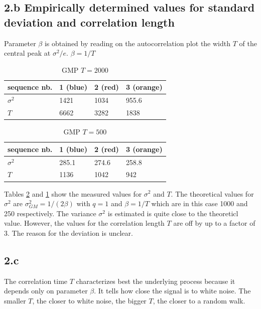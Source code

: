 \documentclass{article}
\begin{document}
\subsection*{2.b Empirically determined values for standard deviation and correlation length}

Parameter $\beta$ is obtained by reading on the autocorrelation plot the width $T$ of the central peak at $\sigma^2/e$. $\beta = 1/T$

\begin{table}[h]
\centering
\begin{tabular}{llll}
sequence nb. & 1 (blue) & 2 (red) & 3 (orange) \\ \hline
$\sigma^2$ &  1421 & 1034 & 955.6  \\
$T$ & 6662 & 3282 & 1838
\end{tabular}
\caption{GMP $T=2000$}
\label{tab:gmp2000}
\end{table}

\begin{table}[h]
\centering
\begin{tabular}{llll}
sequence nb. & 1 (blue) & 2 (red) & 3 (orange) \\ \hline
$\sigma^2$ &  285.1 & 274.6 & 258.8  \\
$T$ & 1136 & 1042 & 942
\end{tabular}
\caption{GMP $T=500$}
\label{tab:gmp500}
\end{table}

Tables \ref{tab:gmp500} and \ref{tab:gmp2000} show the measured values for $\sigma^2$ and $T$.
The theoretical values for $\sigma^2$ are $\sigma^2_{GM} = 1/(2\beta)$ with $q=1$ and $\beta=1/T$ which are in this case 1000 and 250 respectively.
The variance $\sigma^2$ is estimated is quite close to the theoreticl value.
However, the values for the correlation length $T$ are off by up to a factor of 3. The reason for the deviation is unclear.

\subsection*{2.c}
The correlation time $T$ characterizes best the underlying process because it depends only on parameter $\beta$.
It tells how close the signal is to white noise.
The smaller $T$, the closer to white noise, the bigger $T$, the closer to a random walk.
\end{document}
